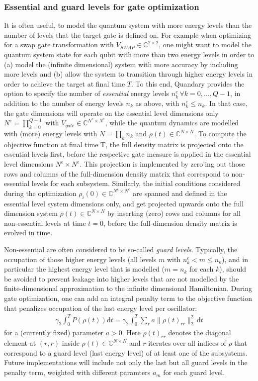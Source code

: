 \documentclass[11pt]{article}
\newcommand{\C}{\mathds{C}}
\begin{document}
\subsubsection{Essential and guard levels for gate optimization}
It is often useful, to model the quantum system with more energy levels than the number of levels that the target gate is defined on. For example when optimizing for a swap gate transformation with $V_{SWAP}\in\C^{2\times 2}$, one might want to model the quantum system state for each qubit with more than two energy levels in order to (a) model the (infinite dimensional) system with more accuracy by including more levels and (b) allow the system to transition through higher energy levels in order to achieve the target at final time $T$. 
To this end, Quandary provides the option to specify the number of \textit{essential} energy levels $n_k^e \, \forall k=0,\dots,Q-1$, in addition to the number of energy levels $n_k$ as above, with $n_k^e \leq n_k$. In that case, the gate dimensions will operate on the essential level dimensions only $N^e = \prod_{k=0}^{Q-1}$ with $V_{gate} \in \C^{N^e \times N^e}$, while the quantum dynamics are modelled with (more) energy levels with $N=\prod_k n_k$ and $\rho(t)\in \C^{N\times N}$. 
To compute the objective function at final time T, the full density matrix is projected onto the essential levels first, before the respective gate measure is applied in the essential level dimensions $N^e \times N^e$. 
This projection is implemented by zero'ing out those rows and columns of the full-dimension density matrix that correspond to non-essential levels for each subsystem. 
Similarly, the initial conditions considered during the optimization $\rho_i(0)\in\C^{N^e \times N^e}$ are spanned and defined in the essential level system dimensions only, and get projected upwards onto the full dimension system $\rho(t)\in \C^{N \times N}$ by inserting (zero) rows and columns for all non-essential levels at time $t=0$, before the full-dimension density matrix is evolved in time. 

Non-essential are often considered to be so-called \textit{guard levels}. Typically, the occupation of those higher energy levels (all levels $m$ with $n_k^e < m \leq n_k$), and in particular the highest energy level that is modelled ($m=n_k$ for each $k$), should be avoided to prevent leakage into higher levels that are not modelled by the finite-dimensional approximation to the infinite dimensional Hamiltonian. During gate optimization, one can add an integral penalty term to the objective function that penalizes occupation of the last energy level per oscillator:
\begin{align}
  \gamma_2 \int_0^T P(\rho(t)) \mathrm{d}t = \gamma_2 \int_0^T \sum_{r} a\| \rho(t)_{rr} \|^2_2 \, \mathrm{d}t
\end{align}
for a (currently fixed) parameter $a>0$. Here $\rho(t)_{rr}$ denotes the diagonal element at $(r,r)$ inside $\rho(t)\in \C^{N\times N}$ and $r$ iterates over all indices of $\rho$ that correspond to a guard level (last energy level) of at least one of the subsystems. Future implementations will include not only the last but all guard levels in the penalty term, weighted with different paramters $a_{m}$ for each guard level. 
\end{document}
